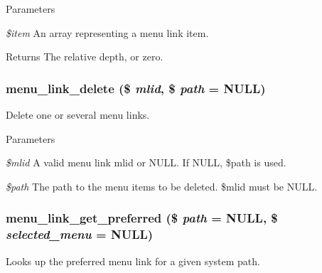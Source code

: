 \begin{DoxyParams}{Parameters}
\item[{\em \$item}]An array representing a menu link item.\end{DoxyParams}
\begin{DoxyReturn}{Returns}
The relative depth, or zero. 
\end{DoxyReturn}
\hypertarget{group__menu_gacb2dddc8ca84476f38a90f4487156b12}{
\subsubsection[{menu\_\-link\_\-delete}]{\setlength{\rightskip}{0pt plus 5cm}menu\_\-link\_\-delete (\$ {\em mlid}, \/  \$ {\em path} = {\ttfamily NULL})}}
\label{group__menu_gacb2dddc8ca84476f38a90f4487156b12}
Delete one or several menu links.


\begin{DoxyParams}{Parameters}
\item[{\em \$mlid}]A valid menu link mlid or NULL. If NULL, \$path is used. \item[{\em \$path}]The path to the menu items to be deleted. \$mlid must be NULL. \end{DoxyParams}
\hypertarget{group__menu_gad5fbd7dfd77f1496d636d130a3ff591d}{
\subsubsection[{menu\_\-link\_\-get\_\-preferred}]{\setlength{\rightskip}{0pt plus 5cm}menu\_\-link\_\-get\_\-preferred (\$ {\em path} = {\ttfamily NULL}, \/  \$ {\em selected\_\-menu} = {\ttfamily NULL})}}
\label{group__menu_gad5fbd7dfd77f1496d636d130a3ff591d}
Looks up the preferred menu link for a given system path.


